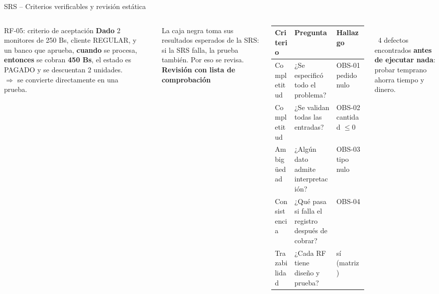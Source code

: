 \documentclass[aspectratio=169,10pt]{beamer}
\begin{document}
\begin{frame}{SRS -- Criterios verificables y revisión estática}
\begin{columns}[T]
\begin{block}{RF-05: criterio de aceptación}
\scriptsize \textbf{Dado} 2 monitores de 250 Bs, cliente REGULAR, y un banco que aprueba,
\textbf{cuando} se procesa,
\textbf{entonces} se cobran \textbf{450 Bs}, el estado es PAGADO y se descuentan 2 unidades.\\[2pt]
$\Rightarrow$ se convierte directamente en una prueba.
\end{block}
\centering
{}\\[2pt]
\raggedright\tiny La caja negra toma sus resultados esperados de la SRS: si la SRS falla, la prueba también. Por eso se revisa.
\textbf{\small Revisión con lista de comprobación}\\[2pt]
\scriptsize
\begin{tabularx}{\linewidth}{@{}lXl@{}}
\toprule
\textbf{Criterio} & \textbf{Pregunta} & \textbf{Hallazgo}\\
\midrule
Completitud & ¿Se especificó todo el problema? & OBS-01 pedido nulo\\
Completitud & ¿Se validan todas las entradas? & OBS-02 cantidad $\leq 0$\\
Ambigüedad & ¿Algún dato admite interpretación? & OBS-03 tipo nulo\\
Consistencia & ¿Qué pasa si falla el registro después de cobrar? & OBS-04\\
Trazabilidad & ¿Cada RF tiene diseño y prueba? & sí (matriz)\\
\bottomrule
\end{tabularx}\\[5pt]
\faSearch\ 4 defectos encontrados \textbf{antes de ejecutar nada}: probar temprano ahorra tiempo y dinero.
\end{columns}
\end{frame}
\end{document}
